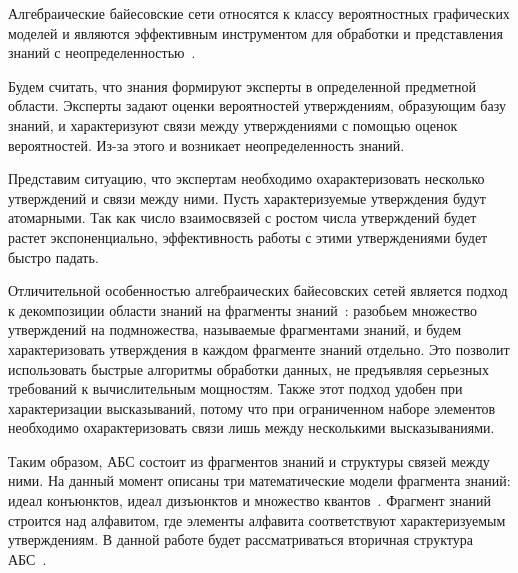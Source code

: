 Алгебраические байесовские сети относятся к классу вероятностных графических моделей и являются эффективным инструментом для обработки и представления знаний с неопределенностью~\cite{184}.     

 Будем считать, что знания формируют эксперты в определенной предметной области. Эксперты задают оценки вероятностей утверждениям, образующим базу знаний, и характеризуют связи между утверждениями с помощью оценок вероятностей. Из-за этого и возникает неопределенность знаний.

 Представим ситуацию, что экспертам необходимо охарактеризовать несколько утверждений и связи между ними. Пусть характеризуемые утверждения будут атомарными. Так как число взаимосвязей с ростом числа утверждений будет растет экспоненциально,  эффективность работы с этими утверждениями будет быстро падать.
 
 Отличительной особенностью алгебраических байесовских сетей является подход к декомпозиции области знаний на фрагменты знаний~\cite{93}: разобьем множество утверждений на подмножества, называемые фрагментами знаний, и будем характеризовать утверждения в каждом фрагменте знаний отдельно. Это позволит использовать быстрые алгоритмы обработки данных, не предъявляя серьезных требований к вычислительным мощностям. Также этот подход удобен при характеризации высказываний, потому что при ограниченном наборе элементов необходимо охарактеризовать связи лишь между несколькими высказываниями. 
 
 Таким образом, АБС состоит из фрагментов знаний и структуры связей между ними. На данный момент описаны три математические модели фрагмента знаний: идеал конъюнктов, идеал дизъюнктов и множество квантов~\cite{121}. Фрагмент знаний строится над алфавитом, где элементы алфавита соответствуют характеризуемым утверждениям. В данной работе будет рассматриваться вторичная структура АБС~\cite{87}.
 
 